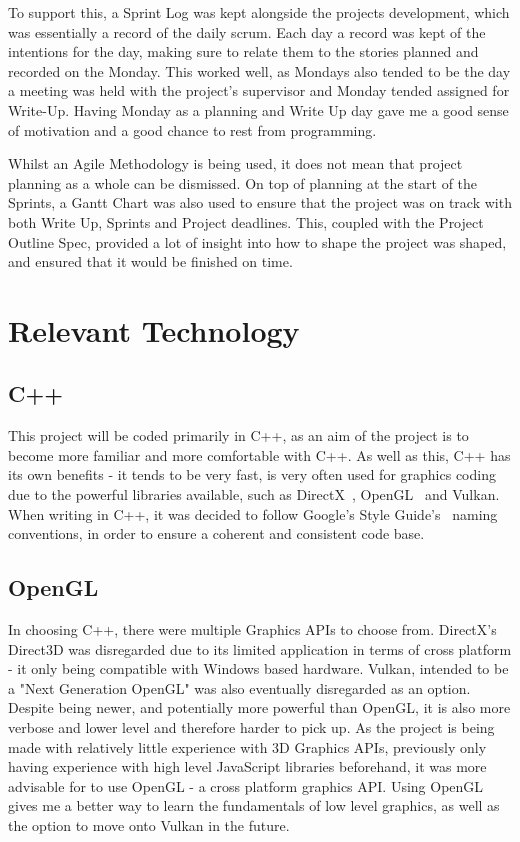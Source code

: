 \documentclass[a4paper,10pt]{report}
\begin{document}
To support this, a Sprint Log was kept alongside the projects development, which was essentially a record of the daily scrum. Each day a record was kept of the intentions for the day, making sure to relate them to the stories planned and recorded on the Monday. This worked well, as Mondays also tended to be the day a meeting was held with the project's supervisor and Monday tended assigned for Write-Up. Having Monday as a planning and Write Up day gave me a good sense of motivation and a good chance to rest from programming. \medskip

Whilst an Agile Methodology is being used, it does not mean that project planning as a whole can be dismissed. On top of planning at the start of the Sprints, a Gantt Chart was also used to ensure that the project was on track with both Write Up, Sprints and Project deadlines. This, coupled with the Project Outline Spec, provided a lot of insight into how to shape the project was shaped, and ensured that it would be finished on time. \medskip

\section{Relevant Technology}

\subsection{C++}

This project will be coded primarily in C++, as an aim of the project is to become more familiar and more comfortable with C++. As well as this, C++ has its own benefits - it tends to be very fast, is very often used for graphics coding due to the powerful libraries available, such as DirectX~\cite{directx_website}, OpenGL~\cite{OpenGL_website} and Vulkan. When writing in C++, it was decided to follow Google's Style Guide's~\cite{google_c_style_guide} naming conventions, in order to ensure a coherent and consistent code base.

\subsection{OpenGL}
In choosing C++, there were multiple Graphics APIs to choose from. DirectX's Direct3D was disregarded due to its limited application in terms of cross platform - it only being compatible with Windows based hardware. Vulkan, intended to be a "Next Generation OpenGL" was also eventually disregarded as an option. Despite being newer, and potentially more powerful than OpenGL, it is also more verbose and lower level and therefore harder to pick up. As the project is being made with relatively little experience with 3D Graphics APIs, previously only having experience with  high level JavaScript libraries beforehand, it was more advisable for to use OpenGL - a cross platform graphics API. Using OpenGL gives me a better way to learn the fundamentals of low level graphics, as well as the option to move onto Vulkan in the future.
\end{document}

